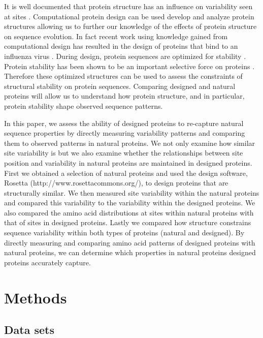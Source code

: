 \documentclass[12pt]{article}
\begin{document}
{\color{blue}
It is well documented that protein structure has an influence on variability seen at sites \cite{Franzosa2009, Ramsey2011}. Computational protein design can be used develop and analyze protein structures allowing us to further our knowledge of the effects of protein structure on sequence evolution. In fact recent work using knowledge gained from computational design has resulted in the design of proteins that bind to an influenza virus \cite{Fleishman2011}. During design, protein sequences are optimized for stability \cite{Butterfoss2006, Das2008}. Protein stability has been shown to be an important selective force on proteins \cite{Drummond2008}. Therefore these optimized structures can be used to assess the constraints of structural stability on protein sequences. Comparing designed and natural proteins will allow us to understand how protein structure, and in particular, protein stability shape observed sequence patterns.
}

{\color{blue}
In this paper, we assess the ability of designed proteins to re-capture natural sequence properties by directly measuring variability patterns and comparing them to observed patterns in natural proteins. We not only examine how similar site variability is but we also examine whether the relationships between site position and variability in natural proteins are maintained in designed proteins.  First we obtained a selection of natural proteins and used the design software, Rosetta (http://www.rosettacommons.org/), to design proteins that are structurally similar. We then measured site variability within the natural proteins and compared this variability to the variability within the designed proteins. We also compared the amino acid distributions at sites within natural proteins with that of sites in designed proteins. Lastly we compared how structure constrains sequence variability within both types of proteins (natural and designed). By directly measuring and comparing amino acid patterns of designed proteins with natural proteins, we can determine which properties in natural proteins designed proteins accurately capture. 
}

\section{Methods}
\label{Methods}

\subsection{Data sets}
\end{document}
